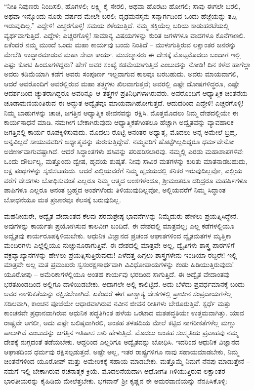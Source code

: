 “ನೀತಿ ನಿಪುಣರು ನಿಂದಿಸಲಿ, ಹೊಗಳಲಿ; ಲಕ್ಷ್ಮಿ ಕೈ ಸೇರಲಿ, ಅಥವಾ ಹೊರಟು ಹೋಗಲಿ; ಸಾವು ಈಗಲೇ ಬರಲಿ, ಅಥವಾ ಇನ್ನೊಂದು ನೂರು ವರ್ಷದ ಮೇಲೇ ಬರಲಿ; ದೃಢಮನಸ್ಕನು ಸನ್ಮಾರ್ಗದಿಂದ ಒಂದು ಹೆಜ್ಜೆಯನ್ನು ತಪ್ಪಿ ಇಡುವುದಿಲ್ಲ.” ಎದ್ದೇಳಿ! ಎಚ್ಚರಗೊಳ್ಳಿ! ಸಮಯ ಕಳೆಯುತ್ತಿದೆ. ನಮ್ಮ ಶಕ್ತಿಯೆಲ್ಲ ಬರಿಯ ಕಾಡುಹರಟೆಯಲ್ಲಿ ವ್ಯರ್ಥವಾಗುತ್ತಿದೆ. ಎದ್ದೇಳಿ; ಎಚ್ಚರಗೊಳ್ಳಿ! ಸಾಮಾನ್ಯ ವಿಷಯಗಳನ್ನು ಕುರಿತ ಜಗಳಗಳೂ ವಾದಗಳೂ ಕೊನೆಗಾಣಲಿ. ಏಕೆಂದರೆ ನಮ್ಮ ಮುಂದೆ ಒಂದು ಮಹಾ ಕಾರ್ಯವು ಬಂದು ನಿಂತಿದೆ – ಮುಳುಗುತ್ತಿರುವ ಲಕ್ಷಾಂತರ ಜನರನ್ನು ಮೇಲೆತ್ತಿ ಉದ್ಧಾರಮಾಡುವ ಮಹಾ ಸೇವಾ ಕಾರ್ಯ. ಮುಸಲ್ಮಾನರು ಈ ದೇಶಕ್ಕೆ ಮೊಟ್ಟಮೊದಲು ಬಂದಾಗ ಇಲ್ಲಿ ಎಷ್ಟು ಕೋಟಿ ಹಿಂದೂಗಳಿದ್ದರು? ಹೇಗೆ ಅವರ ಸಂಖ್ಯೆ ಕಡಮೆಯಾಗುತ್ತಿದೆ ಎಂಬುದನ್ನು ನೋಡಿ! ದಿನ ಕಳೆದ ಹಾಗೆಲ್ಲಾ ಅವರು ಕಡಿಮೆಯಾಗಿ ಕಡೆಗೆ ಅವರು ಸಂಪೂರ್ಣ ಇಲ್ಲವಾಗುವ ಕಾಲವೂ ಬರಬಹುದು. ಅವರು ಮಾಯವಾಗಲಿ, ಆದರೆ ಅವರೊಂದಿಗೆ ಅವರಲ್ಲಿರುವ ಮಹಾ ತತ್ತ್ವಗಳು ಖಿಲವಾಗುತ್ತವೆ; ಅವರಲ್ಲಿ ಎಷ್ಟೇ ದೋಷಗಳಿದ್ಧರೂ, ಎಷ್ಟೇ ಆದರ್ಶದಿಂದ ಚ್ಯುತರಾಗಿದ್ದರೂ ಅವರಿನ್ನೂ ಆ ತತ್ತ್ವಗಳ ಪ್ರತಿನಿಧಿಗಳಾಗಿರುವರು. ಅವರೊಂದಿಗೆ ಆಧ್ಯಾತ್ಮಿಕ ಚಿಂತನೆಯ ಚೂಡಾಮಣಿಯಂತಿರುವ ಈ ಅದ್ಭುತ ಅದ್ವೈತವೂ ಮಾಯವಾಗಿಹೋಗುತ್ತದೆ. ಆದುದರಿಂದ ಎದ್ದೇಳಿ! ಎಚ್ಚರಗೊಳ್ಳಿ! ನಿಮ್ಮ ಬಾಹುಗಳನ್ನು ಚಾಚಿ, ಜಗತ್ತಿನ ಆಧ್ಯಾತ್ಮಿಕ ಜೀವನವನ್ನು ರಕ್ಷಿಸಿ. ಮೊತ್ತಮೊದಲು ನಿಮ್ಮ ದೇಶದಲ್ಲಿಯೇ ಈ ಕಾರ್ಯಸಾಧನೆ ಮಾಡಿ. ನಮಗೀಗ ಬೇಕಾಗಿರುವುದು ಆಧ್ಯಾತ್ಮಿಕತೆಗಿಂತಲೂ ಹೆಚ್ಚಾಗಿ ಅದ್ವೈತವನ್ನು ವ್ಯಾವಹಾರಿಕ ಜಗತ್ತಿನಲ್ಲಿ ಕಾರ್ಯ ರೂಪಕ್ಕಿಳಿಸುವುದು. ಮೊದಲು ರೊಟ್ಟಿ ಅನಂತರ ಅಧ್ಯಾತ್ಮ, ಮೊದಲು ಅನ್ನ ಅಮೇಲೆ ಬ್ರಹ್ಮ. ಅನ್ನವಿಲ್ಲದೆ ಸಾಯುವವರಿಗೆ ಅಧ್ಯಾತ್ಮವನ್ನು ತುರುಕುತ್ತಿದ್ದೇವೆ. ನಮ್ಮವರಿಗೆ ಹೊಟ್ಟೆಗಿಲ್ಲದಿದ್ದರೂ ಧರ್ಮವೇನೋ ಅಜೀರ್ಣವಾಗುವಷ್ಟಾಗಿದೆ. ಆದರೆ ಸಿದ್ಧಾಂತಗಳು ಹಸಿವನ್ನು ಪರಿಹರಿಸಲಾರವು. ನಮ್ಮಲ್ಲಿ ಎರಡು ಮಹಾಶಾಪಗಳಿವೆ: ಒಂದು ದೌರ್ಬಲ್ಯ, ಮತ್ತೊಂದು ದ್ವೇಷ, ಹೃದಯ ಶುಷ್ಕತೆ. ನೀವು ಸಾವಿರ ಮತಗಳನ್ನು ಕುರಿತು ಮಾತನಾಡಬಹುದು, ಲಕ್ಷ ಪಂಥಗಳನ್ನು ಸೃಜಿಸಬಹುದು. ಆದರೆ ಎಲ್ಲಿಯವರೆಗೆ ನಿಮ್ಮ ಹೃದಯದಲ್ಲಿ ಕನಿಕರ ಇರುವುದಿಲ್ಲವೋ, ಎಲ್ಲಿಯ ವರೆಗೆ ವೇದಗಳು ಬೋಧಿಸುವಂತೆ ಎಲ್ಲರೂ ನಿಮ್ಮ ಆತ್ಮದ ಅಂಶಗಳೆಂದೂ, ಶ‍್ರೀಮಂತರೂ ದರಿದ್ರರೂ ಮಹರ್ಷಿಗಳೂ ಪಾಪಿಗಳೂ ಎಲ್ಲರೂ ಅನಂತ ಬ್ರಹ್ಮದ ಅಂಶಗಳೆಂದು ತಿಳಿಯುವುದಿಲ್ಲವೋ, ಅಲ್ಲಿಯವರೆಗೆ ನಿಮ್ಮ ಸಿದ್ಧಾಂತ ಬೋಧನೆಯೂ ಮತ ಪ್ರಚಾರವೂ ಕೆಲಸಕ್ಕೆ ಬರುವುದಿಲ್ಲ.

ಮಹನೀಯರೇ, ಅದ್ವೈತ ವೇದಾಂತದ ಕೆಲವು ಪರಮಶ್ರೇಷ್ಠ ಭಾವನೆಗಳನ್ನು ನಿಮ್ಮೆದುರು ಹೇಳಲು ಪ್ರಯತ್ನಿಸಿದ್ಧೇನೆ. ಅವುಗಳನ್ನು ಕಾರ್ಯತಃ ಪ್ರಯೋಗಿಸುವ ಕಾಲವೀಗ ಬಂದಿದೆ. ಈ ದೇಶದಲ್ಲಿ ಮಾತ್ರವಲ್ಲ; ಎಲ್ಲ ಕಡೆಗಳಲ್ಲಿಯೂ ಅದ್ವೈತವು ಕಾರ್ಯರೂಪಕ್ಕಿಳಿಯಬೇಕು. ಆಧುನಿಕ ವಿಜ್ಞಾನದ ಪ್ರಚಂಡ ಆಘಾತಗಳಿಂದ ದ್ವೈತಮತಗಳ ಮೃತ್ತಿಕಾ ಮಂದಿರಗಳು ಎಲ್ಲೆಲ್ಲಿಯೂ ನುಚ್ಚುನೂರಾಗುತ್ತಿವೆ. ಈ ದೇಶದಲ್ಲಿ ಮಾತ್ರವೇ ಅಲ್ಲ, ದ್ವೈತಿಗಳು ಶಾಸ್ತ್ರ ಪಾಠಗಳಿಗೆ ವಕ್ರವ್ಯಾಖ್ಯಾನಗಳನ್ನು ಹೇಳಲು ಪ್ರಯತ್ನಿಸುತ್ತಿರುವುದು! ಎಳೆದತ್ತ ಹಿಗ್ಗಲು ಶಾಸ್ತ್ರಗಳೇನು ಇಂಡಿಯಾ ರಬ್ಬರೇ! ಇಲ್ಲಿ ಮಾತ್ರವೇ ಅಲ್ಲ ಮತ ಪ್ರಮುಖರು ಸ್ವಸಂರಕ್ಷಣಾರ್ಥವಾಗಿ ವಿವಿಧೋಪಾಯಗಳನ್ನು ಕಂಡು ಹಿಡಿಯುತ್ತಿರುವುದು! ಯೂರೋಪು – ಅಮೆರಿಕಾಗಳಲ್ಲಿಯೂ ಅಂತಹ ಕಾರ್ಯವು ಭರದಿಂದ ಸಾಗುತ್ತಿದೆ. ಈ ಅದ್ವೈತ ವೇದಾಂತವು ಭರತಖಂಡದಿಂದ ಅಲ್ಲಿಗೂ ದಾಳಿಯಿಡಬೇಕು. ಅದಾಗಲೇ ಅಲ್ಲಿ ಕಾಲಿಟ್ಟಿದೆ. ಅದು ಬೆಳೆದು ಪ್ರವರ್ಧಮಾನಕ್ಕೆ ಬಂದು ಅವರ ನಾಗರಿಕತೆಯನ್ನು ರಕ್ಷಿಸಬೇಕಾಗಿದೆ. ಏಕೆಂದರೆ ಈಗ ಪಾಶ್ಚಾತ್ಯ ದೇಶಗಳಲ್ಲಿ ಪ್ರಾಚೀನ ಸಂಪ್ರದಾಯಗಳೆಲ್ಲ ಸಡಿಲವಾಗಿ, ಕಾಂಚನ ಪೂಜೆಯೇ ಆಧಾರವಾಗಿರುವ ನವೀನ ಜೀವನ ರೀತಿಗಳು ಬೇರೂರುತ್ತಿವೆ. ಸ್ಪರ್ಧೆ ಮತ್ತು ಕಾಂಚನವೇ ಪ್ರಧಾನವಾಗಿರುವ ಆಧುನಿಕ ಪದ್ಧತಿಗಿಂತ ಹಳೆಯ ಒರಟಾದ ಮತಪದ್ಧತಿಯೇ ಉತ್ತಮವಾಗಿತ್ತು. ಯಾವ ರಾಷ್ಟ್ರವೇ ಆಗಲೀ, ಅದು ಎಷ್ಟೇ ಬಲಿಷ್ಠವಾಗಿರಲಿ, ಅಂತಹ ತಳಹದಿಯ ಮೇಲೆ ಕಟ್ಟಿದ ನಾಗರೀಕತೆಗಳೆಲ್ಲ ಮಣ್ಣು ಪಾಲಾಗಿವೆ ಎಂಬುದನ್ನು ಜಗತ್ತಿನ ಇತಿಹಾಸ ಸಾರಿ ಹೇಳುತ್ತಿದೆ. ಮೊದಲು ಅಂತಹ ಸಂಸ್ಕೃತಿಯ ಪ್ರವಾಹವು ನಮ್ಮ ದೇಶಕ್ಕೆ ನುಗ್ಗದಂತೆ ತಡೆಯಬೇಕು. ಆದ್ದರಿಂದ ಎಲ್ಲರಿಗೂ ಅದ್ವೈತವನ್ನು ಬೋಧಿಸಿ. ಇದರಿಂದ ಆಧುನಿಕ ವಿಜ್ಞಾನದ ಆಘಾತದಿಂದ ಧರ್ಮವು ರಕ್ಷಿಸಲ್ಪಡುತ್ತದೆ. ಅಷ್ಟೇ ಅಲ್ಲ, ಇತರ ರಾಷ್ಟ್ರಗಳಿಗೂ ನಾವು ಸಹಾಯಮಾಡಬೇಕು, ನಿಮ್ಮ ಚಿಂತನೆಗಳಿಂದ ಯೂರೋಪ್​ ಮತ್ತು ಅಮೇರಿಕಕ್ಕೆ ಸಹಾಯ ಮಾಡಬೇಕು. ಮತ್ತೊಮ್ಮೆ ನಿಮಗೆ ನೆನಪು ಮಾಡುತ್ತೇನೆ – ನಮಗೆ ಇಲ್ಲಿ ಬೇಕಾಗಿರುವ ರಚನಾತ್ಮಕ ಕ್ರಿಯೆ. ಮೊದಲನೆಯದಾಗಿ ಅಧೋಗತಿ ಗಿಳಿಯುತ್ತಿರುವ ಲಕ್ಷಾಂತರ ಭಾರತೀಯರನ್ನು ಕೈಹಿಡಿದು ಮೇಲೆತ್ತಬೇಕು. ಭಗವಾನ್​ ಶ‍್ರೀ ಕೃಷ್ಣನ ಈ ಅಮರವಾಣಿಯನ್ನು ನೆನಪಿಸಿಕೊಳ್ಳಿ:

